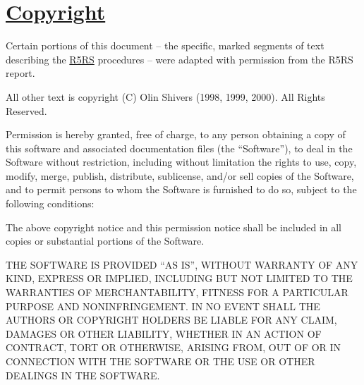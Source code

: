 \section{\texorpdfstring{\href{}{Copyright}}{Copyright}}\label{copyright}

Certain portions of this document -- the specific, marked segments of
text describing the \protect\hyperlink{R5RS}{R5RS} procedures -- were
adapted with permission from the R5RS report.

All other text is copyright (C) Olin Shivers (1998, 1999, 2000). All
Rights Reserved.

Permission is hereby granted, free of charge, to any person obtaining a
copy of this software and associated documentation files (the
``Software''), to deal in the Software without restriction, including
without limitation the rights to use, copy, modify, merge, publish,
distribute, sublicense, and/or sell copies of the Software, and to
permit persons to whom the Software is furnished to do so, subject to
the following conditions:

The above copyright notice and this permission notice shall be included
in all copies or substantial portions of the Software.

THE SOFTWARE IS PROVIDED ``AS IS'', WITHOUT WARRANTY OF ANY KIND,
EXPRESS OR IMPLIED, INCLUDING BUT NOT LIMITED TO THE WARRANTIES OF
MERCHANTABILITY, FITNESS FOR A PARTICULAR PURPOSE AND NONINFRINGEMENT.
IN NO EVENT SHALL THE AUTHORS OR COPYRIGHT HOLDERS BE LIABLE FOR ANY
CLAIM, DAMAGES OR OTHER LIABILITY, WHETHER IN AN ACTION OF CONTRACT,
TORT OR OTHERWISE, ARISING FROM, OUT OF OR IN CONNECTION WITH THE
SOFTWARE OR THE USE OR OTHER DEALINGS IN THE SOFTWARE.
